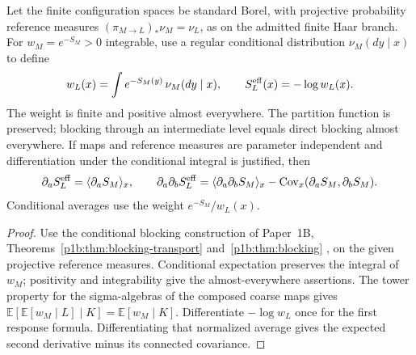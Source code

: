 \documentclass[12pt,a4paper]{article}
\begin{document}
\begin{theorem}
\label{p12:thm:v199-rgas-disintegration}
Let the finite configuration spaces be standard Borel, with projective
probability reference measures
\((\pi_{M\to L})_*\nu_M=\nu_L\), as on the admitted finite Haar branch.
For \(w_M=e^{-S_M}>0\) integrable, use a regular conditional distribution
\(\nu_M(dy\mid x)\) to define
\begin{equation}
\label{p12:eq:v199-rgas-disintegration}
 w_L(x)=\int e^{-S_M(y)}\,\nu_M(dy\mid x),\qquad
 S_L^{\rm eff}(x)=-\log w_L(x).
\end{equation}
The weight is finite and positive almost everywhere.  The partition
function is preserved; blocking through an intermediate level equals
direct blocking almost everywhere.  If maps and reference measures are
parameter independent and differentiation under the conditional integral
is justified, then
\begin{equation}
\label{p12:eq:v199-rgas-score}
 \partial_a S_L^{\rm eff}=\langle \partial_aS_M\rangle_x,\qquad
 \partial_a\partial_b S_L^{\rm eff}
 =\langle\partial_a\partial_b S_M\rangle_x
   -\operatorname{Cov}_x(\partial_aS_M,\partial_bS_M).
\end{equation}
Conditional averages use the weight \(e^{-S_M}/w_L(x)\).
\end{theorem}
\begin{proof}
Use the conditional blocking construction of Paper~1B,
Theorems~\ref{p1b:thm:blocking-transport} and~\ref{p1b:thm:blocking}
\cite{Kugelmann2026Paper1B}, on the given projective reference measures.
Conditional expectation preserves the integral of \(w_M\); positivity and
integrability give the almost-everywhere assertions.  The tower property
for the sigma-algebras of the composed coarse maps gives
\(\mathbb E[\mathbb E[w_M\mid L]\mid K]=\mathbb E[w_M\mid K]\).
Differentiate \(-\log w_L\) once for the first response formula.
Differentiating that normalized average gives the expected second
derivative minus its connected covariance.
\end{proof}
\end{document}
